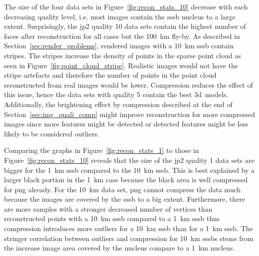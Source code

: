 The size of the four data sets in Figure~\ref{fig:recon_stats_10} decrease with each decreasing quality level, i.e. most images contain the \gls{sssb} nucleus to a large extent. Surprisingly, the \gls{jp2} quality 10 data sets contain the highest number of faces after reconstruction for all cases but the \SI{100}{\kilo\meter} fly-by. As described in Section~\ref{sec:render_problems}, rendered images with a \SI{10}{\kilo\meter} \gls{sssb} contain stripes. The stripes increase the density of points in the sparse point cloud as seen in Figure~\ref{fig:point_cloud_stripe}. Realistic images would not have the stripe artefacts and therefore the number of points in the point cloud reconstructed from real images would be lower. Compression reduces the effect of this issue, hence the data sets with quality 5 contain the best \gls{3d}~models. Additionally, the brightening effect by compression described at the end of Section~\ref{sec:img_quali_comp} might improve reconstruction for more compressed images since more features might be detected or detected features might be less likely to be considered outliers.

Comparing the graphs in Figure~\ref{fig:recon_stats_1} to those in Figure~\ref{fig:recon_stats_10} reveals that the size of the \gls{jp2} quality 1 data sets are bigger for the \SI{1}{\kilo\meter} \gls{sssb} compared to the \SI{10}{\kilo\meter} \gls{sssb}. This is best explained by a larger black portion in the \SI{1}{\kilo\meter} case because the black area is well compressed for \gls{png} already. For the \SI{10}{\kilo\meter} data set, \gls{png} cannot compress the data much because the images are covered by the \gls{sssb} to a big extent. Furthermore, there are more samples with a stronger decreased number of vertices than reconstructed points with a \SI{10}{\kilo\meter} \gls{sssb} compared to a \SI{1}{\kilo\meter} \gls{sssb} thus compression introduces more outliers for a \SI{10}{\kilo\meter} \gls{sssb} than for a \SI{1}{\kilo\meter} \gls{sssb}. The stringer correlation between outliers and compression for \SI{10}{\kilo\meter} \glspl{sssb} stems from the increase image area covered by the nucleus compare to a \SI{1}{\kilo\meter} nucleus.

